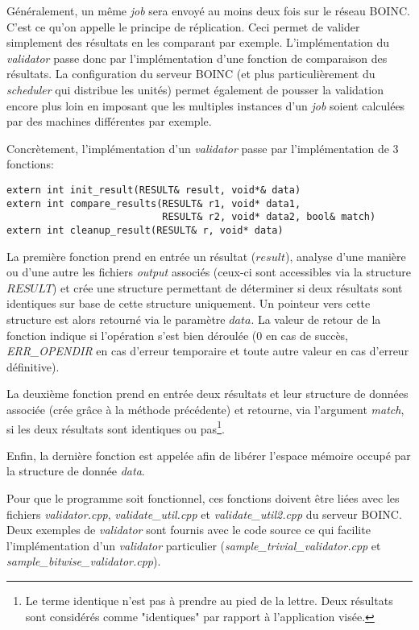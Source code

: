 \documentclass[a4paper, 11pt]{report}
\begin{document}
Généralement, un même \textit{job} sera envoyé au moins deux fois sur le réseau \textsc{BOINC}. C'est ce qu'on appelle le principe de réplication. Ceci permet de valider simplement des résultats en les comparant par exemple. L'implémentation du \textit{validator} passe donc par l'implémentation d'une fonction de comparaison des résultats. La configuration du serveur \textsc{BOINC} (et plus particulièrement du \textit{scheduler} qui distribue les unités) permet également de pousser la validation encore plus loin en imposant que les multiples instances d'un \textit{job} soient calculées par des machines différentes par exemple.

Concrètement, l'implémentation d'un \textit{validator} passe par l'implémentation de 3 fonctions:
\begin{verbatim}
extern int init_result(RESULT& result, void*& data)
extern int compare_results(RESULT& r1, void* data1, 
                           RESULT& r2, void* data2, bool& match)
extern int cleanup_result(RESULT& r, void* data)
\end{verbatim}

La première fonction prend en entrée un résultat ($result$), analyse d'une manière ou d'une autre les fichiers \textit{output} associés (ceux-ci sont accessibles via la structure $RESULT$) et crée une structure permettant de déterminer si deux résultats sont identiques sur base de cette structure uniquement. Un pointeur vers cette structure est alors retourné via le paramètre $data$. La valeur de retour de la fonction indique si l'opération s'est bien déroulée (0 en cas de succès, \textit{ERR\_OPENDIR} en cas d'erreur temporaire et toute autre valeur en cas d'erreur définitive).

La deuxième fonction prend en entrée deux résultats et leur structure de données associée (crée grâce à la méthode précédente) et retourne, via l'argument \textit{match}, si les deux résultats sont identiques ou pas\footnote{Le terme identique n'est pas à prendre au pied de la lettre. Deux résultats sont considérés comme "identiques" par rapport à l'application visée.}.

Enfin, la dernière fonction est appelée afin de libérer l'espace mémoire occupé par la structure de donnée \textit{data}.

Pour que le programme soit fonctionnel, ces fonctions doivent être liées avec les fichiers \textit{validator.cpp}, \textit{validate\_util.cpp} et \textit{validate\_util2.cpp} du serveur \textsc{BOINC}. Deux exemples de \textit{validator} sont fournis avec le code source ce qui facilite l'implémentation d'un \textit{validator} particulier (\textit{sample\_trivial\_validator.cpp} et \textit{sample\_bitwise\_validator.cpp}).
\end{document}
